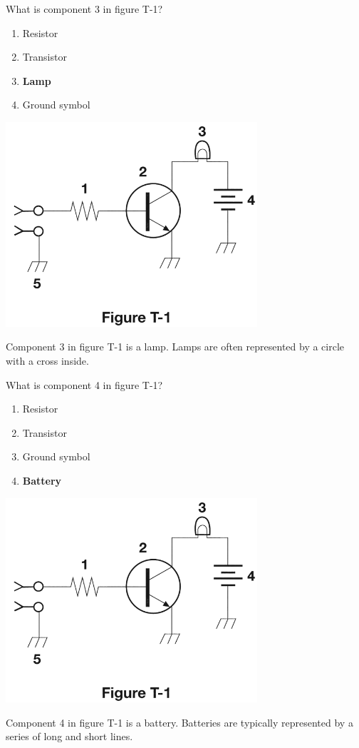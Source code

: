 \begin{tcolorbox}[
    colback=gray!10!white,
    colframe=black!75!black,
    title={T6C04},
    sidebyside,
    sidebyside align=top,
    lefthand width=0.45\textwidth
]
What is component 3 in figure T-1?
\begin{enumerate}[label=\Alph*),noitemsep]
    \item Resistor
    \item Transistor
    \item \textbf{Lamp}
    \item Ground symbol
\end{enumerate}
\tcblower
\includegraphics[width=0.7\textwidth]{tech/images/t1.png}
\end{tcolorbox}
Component 3 in figure T-1 is a lamp. Lamps are often represented by a circle with a cross inside.

\begin{tcolorbox}[
    colback=gray!10!white,
    colframe=black!75!black,
    title={T6C05},
    sidebyside,
    sidebyside align=top,
    lefthand width=0.45\textwidth
]
What is component 4 in figure T-1?
\begin{enumerate}[label=\Alph*),noitemsep]
    \item Resistor
    \item Transistor
    \item Ground symbol
    \item \textbf{Battery}
\end{enumerate}
\tcblower
\includegraphics[width=0.7\textwidth]{tech/images/t1.png}
\end{tcolorbox}
Component 4 in figure T-1 is a battery. Batteries are typically represented by a series of long and short lines.



